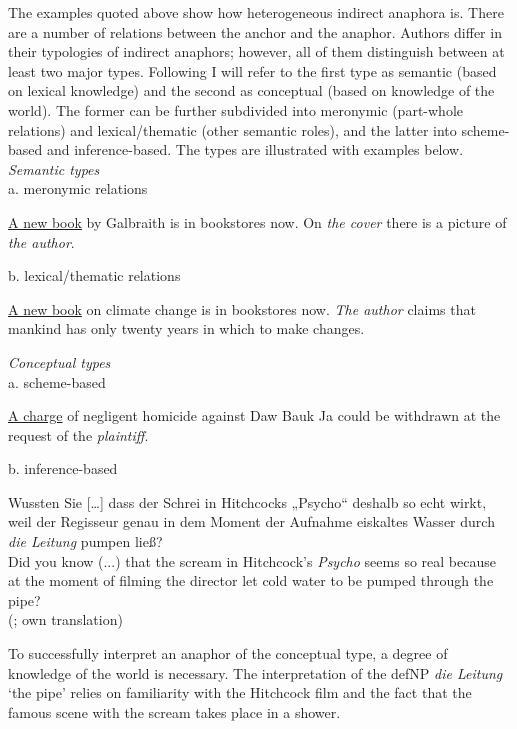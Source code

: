 \documentclass[output=paper]{langsci/langscibook}
\begin{document}
The examples quoted above show how heterogeneous indirect anaphora is. There are a number of relations between the anchor and the anaphor. Authors differ in their typologies of indirect anaphors; however, all of them distinguish between at least two major types. Following \cite{schwarz:00} I will refer to the first type as semantic (based on lexical knowledge) and the second as conceptual (based on knowledge of the world). The former can be further subdivided into meronymic (part-whole relations) and lexical/thematic (other semantic roles), and the latter into scheme-based and inference-based. The types are illustrated with examples below.\\[-2mm]

\noindent
{\emph{Semantic types}} \\
a. meronymic relations

	\begin{exe}
	\ex\label{6ex:12}
	{\ul{A new book}} by Galbraith is in bookstores now. On {\emph{the cover}} there is a picture of {\emph{the author}}.
	\end{exe}

\noindent
b. lexical/thematic relations
	\begin{exe}
	\ex\label{6ex:13}
	{\ul{A new book}} on climate change is in bookstores now. {\emph{The author}} claims that mankind has only twenty years in which to make changes.
	\end{exe}

\noindent
{\emph{Conceptual types}} \\
a. scheme-based
	\begin{exe}
	\ex\label{6ex:14}
	{\ul{A charge}} of negligent homicide against Daw Bauk Ja could be withdrawn at the request of the {\emph{plaintiff}}.
	\end{exe}

\noindent
b. inference-based 
	\begin{exe}
	\ex\label{6ex:15}
	Wussten Sie […] dass der Schrei in Hitchcocks „Psycho`` deshalb so echt wirkt, weil der Regisseur genau in dem Moment der Aufnahme eiskaltes Wasser durch {\emph{die Leitung}} pumpen ließ? \\
	Did you know (...) that the scream in Hitchcock's {\emph{Psycho}} seems so real because at the moment of filming the director let cold water to be pumped through the pipe?\\[1mm]
	(\citealt[][102]{consten:04}; own translation)
	\end{exe}

To successfully interpret an anaphor of the conceptual type, a degree of knowledge of the world is necessary. The interpretation of the defNP {\emph{die Leitung}} `the pipe' relies on familiarity with the Hitchcock film and the fact that the famous scene with the scream takes place in a shower. 
\end{document}
